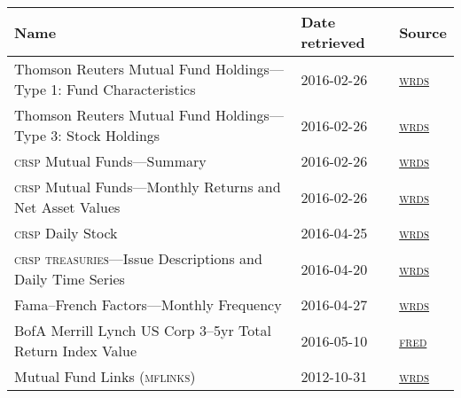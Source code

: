 \begin{tabularx}{\textwidth}{L l l}
    \toprule
     Name & Date retrieved & Source \\ 
     \midrule
     Thomson Reuters Mutual Fund Holdings---Type 1: Fund Characteristics & 2016-02-26 & \href{http://wrds-web.wharton.upenn.edu/}{\textsc{wrds}} \\ [4ex]
     Thomson Reuters Mutual Fund Holdings---Type 3: Stock Holdings & 2016-02-26 & \href{http://wrds-web.wharton.upenn.edu/}{\textsc{wrds}} \\ [4ex]
     \textsc{crsp} Mutual Funds---Summary & 2016-02-26 & \href{http://wrds-web.wharton.upenn.edu/}{\textsc{wrds}} \\ [1ex]
     \textsc{crsp} Mutual Funds---Monthly Returns and Net Asset Values & 2016-02-26 & \href{http://wrds-web.wharton.upenn.edu/}{\textsc{wrds}} \\ [4ex]
     \textsc{crsp} Daily Stock & 2016-04-25 & \href{http://wrds-web.wharton.upenn.edu/}{\textsc{wrds}} \\ [1ex]
     \textsc{crsp} \textsc{treasuries}---Issue Descriptions and Daily Time Series & 2016-04-20 & \href{http://wrds-web.wharton.upenn.edu/}{\textsc{wrds}} \\ [4ex]
     Fama--French Factors---Monthly Frequency & 2016-04-27 & \href{http://wrds-web.wharton.upenn.edu/}{\textsc{wrds}} \\ [1ex]
     BofA Merrill Lynch \textsc{US} Corp 3--5yr Total Return Index Value & 2016-05-10 & \href{https://research.stlouisfed.org/fred2/series/BAMLCC2A035YTRI}{\textsc{fred}} \\[4ex]
     Mutual Fund Links (\textsc{mflinks}) & 2012-10-31 & \href{http://wrds-web.wharton.upenn.edu/}{\textsc{wrds}} \\
     \bottomrule
\end{tabularx}